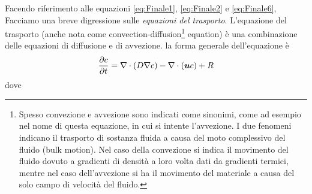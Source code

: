 Facendo riferimento alle equazioni \ref{eq:Finale1}, \ref{eq:Finale2} e \ref{eq:Finale6}, Facciamo una breve digressione sulle \textit{equazioni del trasporto}. L'equazione del trasporto (anche nota come convection-diffusion\footnote{Spesso convezione e avvezione sono indicati come sinonimi, come ad esempio nel nome di questa equazione, in cui si intente l'avvezione. I due fenomeni indicano il trasporto di sostanza fluida a causa del moto complessivo del fluido (bulk motion). Nel caso della convezione si indica il movimento del fluido dovuto a gradienti di densità a loro volta dati da gradienti termici, mentre nel caso dell'avvezione si ha il movimento del materiale a causa del solo campo di velocità del fluido.} equation) è una combinazione delle equazioni di diffusione e di avvezione. 
la forma generale dell'equazione è 
\begin{equation}
\frac{\partial c}{\partial t} = \V{\nabla}\cdot (D\V{\nabla}c) - \V{\nabla}\cdot (\V{u}c) + R \label{eq:Trasporto}
\end{equation}
dove
